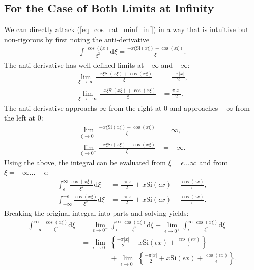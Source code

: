 \subsection{For the Case of Both Limits at Infinity}
We can directly attack (\ref{eq_cos_rat_minf_inf}) in a way that is intuitive but non-rigorous by first noting the anti-derivative
\begin{align}
	\int \! \frac{\cos(\xi x)}{\xi^2} \mathrm{d}\xi =
	\frac{-x \xi\mathrm{Si}(x\xi) + \cos(x\xi)}{\xi}.
\end{align}
The anti-derivative has well defined limits at $+\infty$ and $-\infty$:
\begin{align}
	\lim_{\xi \to \infty} \frac{-x \xi\mathrm{Si}(x\xi) + \cos(x\xi)}{\xi} &= \frac{-\pi|x|}{2}, \\
	\lim_{\xi \to -\infty} \frac{-x \xi\mathrm{Si}(x\xi) + \cos(x\xi)}{\xi} &= \frac{\pi|x|}{2}.
\end{align}
The anti-derivative approachs $\infty$ from the right at $0$ and approaches $-\infty$ from the left
at $0$:
\begin{align}
	\lim_{\xi \to 0^+} \frac{-x \xi\mathrm{Si}(x\xi) + \cos(x\xi)}{\xi} &= \infty, \\
	\lim_{\xi \to 0^-} \frac{-x \xi\mathrm{Si}(x\xi) + \cos(x\xi)}{\xi} &= -\infty.
\end{align}
Using the above, the integral can be evaluated from
$\xi=\epsilon...\infty$ and from $\xi=-\infty...-\epsilon$:
\begin{align}
	\int_{\epsilon}^{\infty} \! \frac{\cos(x \xi)}{\xi^2} \mathrm{d}\xi
	&= \frac{-\pi|x|}{2} + x \mathrm{Si}(\epsilon x) + \frac{\cos(\epsilon x)}{\epsilon},
	\\
	\int_{-\infty}^{-\epsilon} \! \frac{\cos(x \xi)}{\xi^2} \mathrm{d}\xi
	&= \frac{-\pi|x|}{2} + x \mathrm{Si}(\epsilon x) + \frac{\cos(\epsilon x)}{\epsilon}.
\end{align}
Breaking the original integral into parts and solving yields:
\begin{align}
	\int_{-\infty}^{\infty} \! \frac{\cos(x \xi)}{\xi^2} \mathrm{d}\xi
	&= \lim_{\epsilon \to 0^-} \int_{\epsilon}^{\infty} \! \frac{\cos(x \xi)}{\xi^2} \mathrm{d}\xi
	+ \lim_{\epsilon \to 0^+} \int_{\epsilon}^{\infty} \! \frac{\cos(x \xi)}{\xi^2} \mathrm{d}\xi \\
	&= \lim_{\epsilon \to 0^-} \left\{ \frac{-\pi|x|}{2} + x \mathrm{Si}(\epsilon x) + \frac{\cos(\epsilon x)}{\epsilon}\right\} \\
	&\quad\quad\quad\quad+ \lim_{\epsilon \to 0^+} \left\{ \frac{-\pi|x|}{2} + x \mathrm{Si}(\epsilon x) + \frac{\cos(\epsilon x)}{\epsilon}\right\}.
\end{align}
